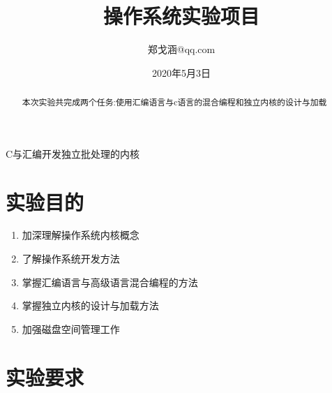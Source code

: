 \documentclass[a4paper, 11pt]{article} %
\title{\textbf{操作系统实验项目}\\ %
} %
\author{郑戈涵\quad 17338233\quad 931252924@qq.com} %
\date{2020年5月3日} %
\makeatletter
\renewcommand{\maketitle}{ %
\begin{center} %
{\LARGE\@title} %

\large{\@subtitle}

\vspace{1em} %

{\large\@author} %

\end{center}
}
\newcommand\@subtitle{C与汇编开发独立批处理的内核}
\makeatother
\begin{document}
\maketitle %


\renewcommand{\abstractname}{摘要} %

\begin{abstract}
  本次实验共完成两个任务:使用汇编语言与c语言的混合编程和独立内核的设计与加载
\end{abstract}


\vspace{1em} %

\setcounter{tocdepth}{2}
\renewcommand{\contentsname}{目录}
\tableofcontents


\pagebreak

\section{实验目的}

\begin{enumerate}
  \item 加深理解操作系统内核概念
  \item 了解操作系统开发方法
  \item 掌握汇编语言与高级语言混合编程的方法
  \item 掌握独立内核的设计与加载方法
  \item 加强磁盘空间管理工作
\end{enumerate}


\section{实验要求}
\end{document}
